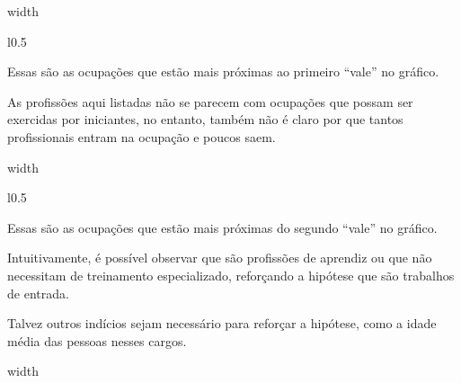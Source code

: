 \documentclass[10pt,a4paper,final]{article}
\newcommand\disappearingrule{%
  \par %
  \vskip10pt %
  \leaders\vrule width \textwidth\vskip0.4pt %
  \nointerlineskip %
  \vskip10pt %
}
\begin{document}
\disappearingrule

\begin{minipage}[t][18\baselineskip]{\linewidth}
  \begin{wrapfigure}{l}{0.5\textwidth}
  \end{wrapfigure}
  
  Essas são as ocupações que estão mais próximas ao primeiro \enquote{vale} no gráfico.
  
  As profissões aqui listadas não se parecem com ocupações que possam ser exercidas por iniciantes, no entanto, também não é claro por que tantos profissionais entram na ocupação e poucos saem.
\end{minipage}

\disappearingrule

\begin{minipage}[t][18\baselineskip]{\linewidth}
  \begin{wrapfigure}{l}{0.5\textwidth}
  \end{wrapfigure}
  
    
  Essas são as ocupações que estão mais próximas do segundo  \enquote{vale} no gráfico.
  
  Intuitivamente, é possível observar que são profissões de aprendiz ou que não necessitam de treinamento especializado, reforçando a hipótese que são trabalhos de entrada.
  
  Talvez outros indícios sejam necessário para reforçar a hipótese, como a idade média das pessoas nesses cargos.
\end{minipage}

\disappearingrule

\newpage

\def\refname{REFERÊNCIAS BIBLIOGRÁFICAS}


\end{document}
